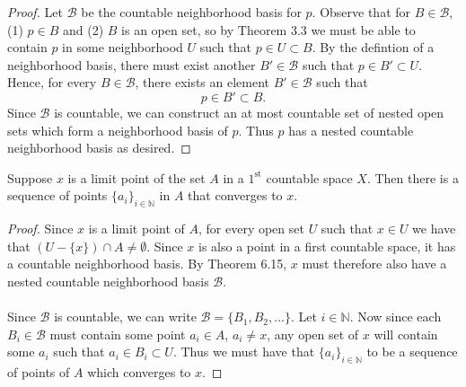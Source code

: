 \documentclass[a4paper,12pt,twoside]{hmcpset}
\begin{document}
\begin{proof}
    Let $\mathscr{B}$ be the countable neighborhood basis for $p$.
    Observe that for $B \in \mathscr{B}$, (1) $p \in B$ and (2) $B$ is
    an open set, so by Theorem 3.3 we must be able to contain $p$ in
    some neighborhood $U$ such that $p \in U \subset B$. By the
    defintion of a neighborhood basis, there must exist another $B'
    \in \mathscr{B}$ such that $p \in B' \subset U$. Hence, for every
    $B \in \mathscr{B}$, there exists an element $B' \in \mathscr{B}$
    such that 
    \[
      p \in B' \subset B.  
    \]
    Since $\mathscr{B}$ is countable, we can construct an at most
    countable set of nested open sets which form a neighborhood basis
    of $p$. Thus $p$ has a nested countable neighborhood basis as desired.
\end{proof}


\begin{problem}[Theorem 6.18]
    Suppose $x$ is a limit point of the set $A$ in a $1^{\text{st}}$
    countable space $X$. Then there is a sequence of points $\{a_i\}
    _{i \in \mathbb{N}}$ in $A$ that converges to $x$.     
\end{problem}

\begin{proof}
    Since $x$ is a limit point of $A$, for every open set $U$ such
    that $x \in U$ we have that $(U - \{x\}) \cap A \ne \emptyset$.
    Since $x$ is also a point in a first countable space, it has a
    countable neighborhood basis. By Theorem 6.15, $x$ must therefore
    also have a nested countable neighborhood basis $\mathscr{B}$. 
    \\
    \\
    Since $\mathscr{B}$ is countable, 
    we can write $\mathscr{B} = \{B_1, B_2, \dots \}$.
    Let $i \in \mathbb{N}$.
    Now since each $B_i\in \mathscr{B}$ 
    must contain some point $a_i \in A$, $a_i \ne x$, any open set of
    $x$ will contain some $a_i$ such that $a_i \in B_i \subset U$.
    Thus we must have that $\{a_i\}_{i \in \mathbb{N}}$ to be a
    sequence of points of $A$ which converges to $x$.
\end{proof}
\end{document}
